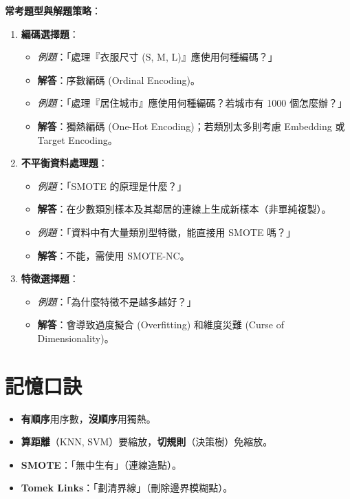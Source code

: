 \documentclass[
  letterpaper,
  DIV=11,
  numbers=noendperiod]{scrreprt}
\providecommand{\tightlist}{%
  \setlength{\itemsep}{0pt}\setlength{\parskip}{0pt}}
\begin{document}
\textbf{常考題型與解題策略}：

\begin{enumerate}
\def\labelenumi{\arabic{enumi}.}
\tightlist
\item
  \textbf{編碼選擇題}：

  \begin{itemize}
  \tightlist
  \item
    \emph{例題}：「處理『衣服尺寸 (S, M, L)』應使用何種編碼？」
  \item
    \textbf{解答}：序數編碼 (Ordinal Encoding)。
  \item
    \emph{例題}：「處理『居住城市』應使用何種編碼？若城市有 1000
    個怎麼辦？」
  \item
    \textbf{解答}：獨熱編碼 (One-Hot Encoding)；若類別太多則考慮
    Embedding 或 Target Encoding。
  \end{itemize}
\item
  \textbf{不平衡資料處理題}：

  \begin{itemize}
  \tightlist
  \item
    \emph{例題}：「SMOTE 的原理是什麼？」
  \item
    \textbf{解答}：在少數類別樣本及其鄰居的連線上生成新樣本（非單純複製）。
  \item
    \emph{例題}：「資料中有大量類別型特徵，能直接用 SMOTE 嗎？」
  \item
    \textbf{解答}：不能，需使用 SMOTE-NC。
  \end{itemize}
\item
  \textbf{特徵選擇題}：

  \begin{itemize}
  \tightlist
  \item
    \emph{例題}：「為什麼特徵不是越多越好？」
  \item
    \textbf{解答}：會導致過度擬合 (Overfitting) 和維度災難 (Curse of
    Dimensionality)。
  \end{itemize}
\end{enumerate}

\section{記憶口訣}\label{ux8a18ux61b6ux53e3ux8a23-3}

\begin{itemize}
\tightlist
\item
  \textbf{有順序}用序數，\textbf{沒順序}用獨熱。
\item
  \textbf{算距離}（KNN, SVM）要縮放，\textbf{切規則}（決策樹）免縮放。
\item
  \textbf{SMOTE}：「無中生有」（連線造點）。
\item
  \textbf{Tomek Links}：「劃清界線」（刪除邊界模糊點）。
\end{itemize}
\end{document}
